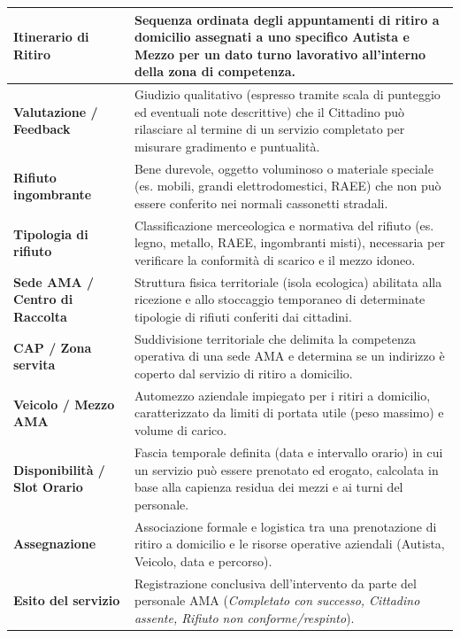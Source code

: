 \begin{center}
\begin{longtable}{|p{4.5cm}|p{11cm}|}
\textbf{Itinerario di Ritiro} & Sequenza ordinata degli appuntamenti di ritiro a domicilio assegnati a uno specifico Autista e Mezzo per un dato turno lavorativo all'interno della zona di competenza. \\ \hline

\textbf{Valutazione / Feedback} & Giudizio qualitativo (espresso tramite scala di punteggio ed eventuali note descrittive) che il Cittadino può rilasciare al termine di un servizio completato per misurare gradimento e puntualità. \\ \hline

\textbf{Rifiuto ingombrante} & Bene durevole, oggetto voluminoso o materiale speciale (es. mobili, grandi elettrodomestici, RAEE) che non può essere conferito nei normali cassonetti stradali. \\ \hline

\textbf{Tipologia di rifiuto} & Classificazione merceologica e normativa del rifiuto (es. legno, metallo, RAEE, ingombranti misti), necessaria per verificare la conformità di scarico e il mezzo idoneo. \\ \hline

\textbf{Sede AMA / Centro di Raccolta} & Struttura fisica territoriale (isola ecologica) abilitata alla ricezione e allo stoccaggio temporaneo di determinate tipologie di rifiuti conferiti dai cittadini. \\ \hline

\textbf{CAP / Zona servita} & Suddivisione territoriale che delimita la competenza operativa di una sede AMA e determina se un indirizzo è coperto dal servizio di ritiro a domicilio. \\ \hline

\textbf{Veicolo / Mezzo AMA} & Automezzo aziendale impiegato per i ritiri a domicilio, caratterizzato da limiti di portata utile (peso massimo) e volume di carico. \\ \hline

\textbf{Disponibilità / Slot Orario} & Fascia temporale definita (data e intervallo orario) in cui un servizio può essere prenotato ed erogato, calcolata in base alla capienza residua dei mezzi e ai turni del personale. \\ \hline

\textbf{Assegnazione} & Associazione formale e logistica tra una prenotazione di ritiro a domicilio e le risorse operative aziendali (Autista, Veicolo, data e percorso). \\ \hline

\textbf{Esito del servizio} & Registrazione conclusiva dell'intervento da parte del personale AMA (\textit{Completato con successo, Cittadino assente, Rifiuto non conforme/respinto}). \\ \hline


\end{longtable}
\end{center}
